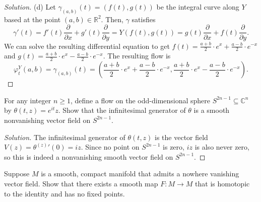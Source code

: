 \documentclass[10pt]{article}
\providecommand{\CC}{\mathbb C}
\providecommand{\RR}{\mathbb R}
\newenvironment{soln}{\begin{proof}[Solution]}{\end{proof}}
\providecommand{\tanvec}[1]{\frac{\partial}{\partial #1}}
\begin{document}
\begin{soln}
    (d) Let $\gamma_{(a,b)}(t) = (f(t),g(t))$ be the integral curve
    along $Y$ based at the point $(a,b)\in\RR^2$.
    Then, $\gamma$ satisfies
    \[
	\gamma'(t) = f'(t)\tanvec x + g'(t)\tanvec y = Y(f(t),g(t))
	= g(t)\tanvec x + f(t)\tanvec y.
    \]
    We can solve the resulting differential equation to get
    $f(t) = \frac{a+b}2\cdot e^x + \frac{a-b}2\cdot e^{-x}$ and
    $g(t) = \frac{a+b}2\cdot e^x - \frac{a-b}2\cdot e^{-x}$.
    The resulting flow is
    \begin{equation*}
	\varphi_t^Y(a,b) = \gamma_{(a,b)}(t)
	= \left(\frac{a+b}2\cdot e^x + \frac{a-b}2\cdot e^{-x},
	\frac{a+b}2\cdot e^x - \frac{a-b}2\cdot e^{-x}\right).
    \end{equation*}
\end{soln}
\pagebreak

\begin{problem}
    For any integer $n\ge 1$, define a flow on
    the odd-dimensional sphere $S^{2n-1}\subseteq\CC^n$ by
    $\theta(t,z) = e^{it}z$. Show that the infinitesimal generator
    of $\theta$ is a smooth nonvanishing vector field on $S^{2n-1}$.
\end{problem}

\begin{soln}
    The infinitesimal generator of $\theta(t,z)$ is the vector field
    $V(z) = {\theta^{(z)}}'(0) = iz$.
    Since no point on $S^{2n-1}$ is zero,
    $iz$ is also never zero, so this is indeed
    a nonvanishing smooth vector field on $S^{2n-1}$.
\end{soln}

\begin{problem}
    Suppose $M$ is a smooth, compact manifold that admits
    a nowhere vanishing vector field. Show that there exists
    a smooth map $F\colon M\to M$ that is homotopic to the identity
    and has no fixed points.
\end{problem}
\end{document}
